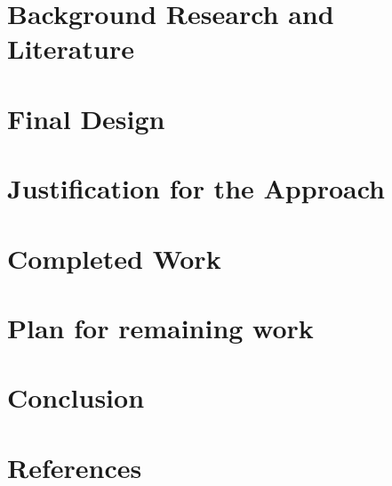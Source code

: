 \documentclass[12pt,a4paper,twocolumn]{scrartcl}
\begin{document}
\section{Background Research and Literature}
\section{Final Design}
\section{Justification for the Approach}
\section{Completed Work}
\section{Plan for remaining work}
\section{Conclusion}
\section{References}
{}

\end{document}
